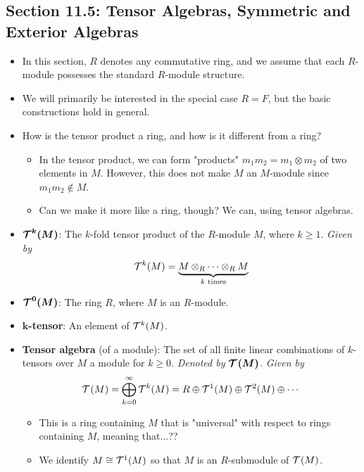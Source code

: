 \documentclass[../notes.tex]{subfiles}
\begin{document}
\subsection*{Section 11.5: Tensor Algebras, Symmetric and Exterior Algebras}
\begin{itemize}
    \item In this section, $R$ denotes any commutative ring, and we assume that each $R$-module possesses the standard $R$-module structure.
    \item We will primarily be interested in the special case $R=F$, but the basic constructions hold in general.
    \item How is the tensor product a ring, and how is it different from a ring?
    \begin{itemize}
        \item In the tensor product, we can form "products" $m_1m_2=m_1\otimes m_2$ of two elements in $M$. However, this does not make $M$ an $M$-module since $m_1m_2\notin M$.
        \item Can we make it more like a ring, though? We can, using tensor algebras.
    \end{itemize}
    \item $\bm{\ten[k]{M}}$: The $k$-fold tensor product of the $R$-module $M$, where $k\geq 1$. \emph{Given by}
    \begin{equation*}
        \ten[k]{M} = \underbrace{M\otimes_R\cdots\otimes_RM}_{k\text{ times}}
    \end{equation*}
    \item $\bm{\ten[0]{M}}$: The ring $R$, where $M$ is an $R$-module.
    \item \textbf{$\bm{k}$-tensor}: An element of $\ten[k]{M}$.
    \item \textbf{Tensor algebra} (of a module): The set of all finite linear combinations of $k$-tensors over $M$ a module for $k\geq 0$. \emph{Denoted by} $\bm{\ten{M}}$. \emph{Given by}
    \begin{equation*}
        \ten{M} = \bigoplus_{k=0}^\infty\ten[k]{M} = R\oplus\ten[1]{M}\oplus\ten[2]{M}\oplus\cdots
    \end{equation*}
    \begin{itemize}
        \item This is a ring containing $M$ that is "universal" with respect to rings containing $M$, meaning that...??
        \item We identify $M\cong\ten[1]{M}$ so that $M$ is an $R$-submodule of $\ten{M}$.
    \end{itemize}

\end{itemize}
\end{document}
